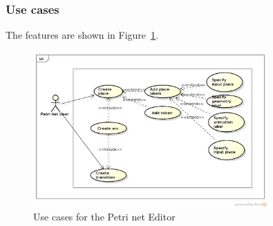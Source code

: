 \subsubsection{Use cases}

The features are shown in Figure~\ref{fig:use-cases-petri-net-editor}.

\begin{figure}[htp]
\begin{center}
  \includegraphics[width=0.8\textwidth]{image/uc-petri-net.png}
  \caption{Use cases for the Petri net Editor}
  \label{fig:use-cases-petri-net-editor}
\end{center}
\end{figure}